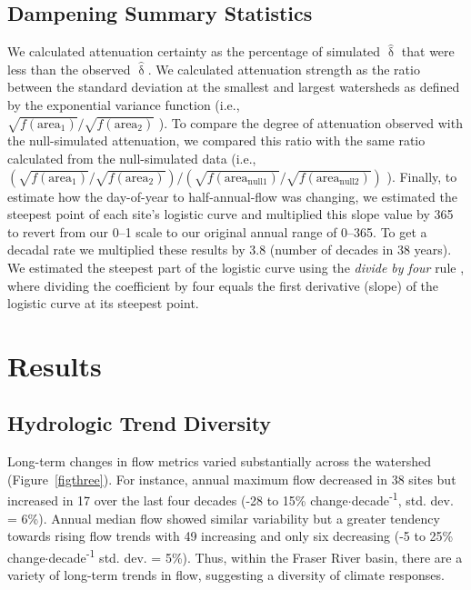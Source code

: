 \documentclass[linenumbers,draft]{AGUJournal}
\begin{document}
\subsection{Dampening Summary Statistics}
We calculated attenuation certainty as the percentage of simulated $\hat{\updelta}$ that were less than the observed $\hat{\updelta}$. We calculated attenuation strength as the ratio between the standard deviation at the smallest and largest watersheds as defined by the exponential variance function (i.e.,\\$\sqrt{f(\mathrm{area}_1)} / \sqrt{f(\mathrm{area}_2)}$ ). To compare the degree of attenuation observed with the null-simulated attenuation, we compared this ratio with the same ratio calculated from the null-simulated data (i.e., $\left( \sqrt{f(\mathrm{area}_1)} / \sqrt{f(\mathrm{area}_2)} \right) / \left( \sqrt{f(\mathrm{area}_{\mathrm{null} 1})} / \sqrt{f(\mathrm{area}_{\mathrm{null} 2})} \right)$ ). Finally, to estimate how the day-of-year to half-annual-flow was changing, we estimated the steepest point of each site's logistic curve and multiplied this slope value by 365 to revert from our 0--1 scale to our original annual range of 0--365. To get a decadal rate we multiplied these results by 3.8 (number of decades in 38 years). We estimated the steepest part of the logistic curve using the \textit{divide by four} rule \citep{Gelman:2008}, where dividing the coefficient by four equals the first derivative (slope) of the logistic curve at its steepest point.

\section{Results}
\subsection{Hydrologic Trend Diversity}
Long-term changes in flow metrics varied substantially across the watershed (Figure~\ref{figthree}). For instance, annual maximum flow decreased in 38 sites but increased in 17 over the last four decades (-28 to 15\% change$\cdot$decade\textsuperscript{-1}, std. dev. = 6\%). Annual median flow showed similar variability but a greater tendency towards rising flow trends with 49 increasing and only six decreasing (-5 to 25\% change$\cdot$decade\textsuperscript{-1} std. dev. = 5\%). Thus, within the Fraser River basin, there are a variety of long-term trends in flow, suggesting a diversity of climate responses.
\end{document}
